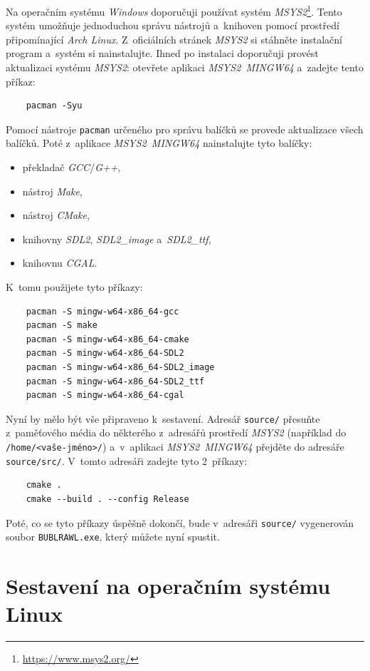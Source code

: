 Na operačním systému \emph{Windows} doporučuji používat systém \emph{MSYS2}\footnote{\url{https://www.msys2.org/}}. Tento systém umožňuje jednoduchou správu nástrojů a~knihoven pomocí prostředí připomínající \emph{Arch Linux}. Z~oficiálních stránek \emph{MSYS2} si stáhněte instalační program a~systém si nainstalujte. Ihned po instalaci doporučuji provést aktualizaci systému \emph{MSYS2}: otevřete aplikaci \emph{MSYS2~MINGW64} a~zadejte tento příkaz:
\begin{verbatim}
    pacman -Syu
\end{verbatim}
Pomocí nástroje \texttt{pacman} určeného pro správu balíčků se provede aktualizace všech balíčků. Poté z~aplikace \emph{MSYS2~MINGW64} nainstalujte tyto balíčky:
\begin{itemize}
    \item překladač \emph{GCC}/\emph{G++},
    \item nástroj \emph{Make},
    \item nástroj \emph{CMake},
    \item knihovny \emph{SDL2}, \emph{SDL2\_image} a~\emph{SDL2\_ttf},
    \item knihovnu \emph{CGAL}.
\end{itemize}
K~tomu použijete tyto příkazy:
\begin{verbatim}
    pacman -S mingw-w64-x86_64-gcc
    pacman -S make
    pacman -S mingw-w64-x86_64-cmake
    pacman -S mingw-w64-x86_64-SDL2
    pacman -S mingw-w64-x86_64-SDL2_image
    pacman -S mingw-w64-x86_64-SDL2_ttf
    pacman -S mingw-w64-x86_64-cgal
\end{verbatim}

Nyní by mělo být vše připraveno k~sestavení. Adresář \texttt{source/} přesuňte z~paměťového média do některého z~adresářů prostředí \emph{MSYS2} (například do \verb|/home/<vaše-jméno>/|) a~v~aplikaci \emph{MSYS2~MINGW64} přejděte do adresáře \texttt{source/src/}. V~tomto adresáři zadejte tyto 2~příkazy:
\begin{verbatim}
    cmake .
    cmake --build . --config Release
\end{verbatim}
Poté, co se tyto příkazy úspěšně dokončí, bude v~adresáři \texttt{source/} vygenerován soubor \texttt{BUBLRAWL.exe}, který můžete nyní spustit.

\section*{Sestavení na operačním systému Linux}

